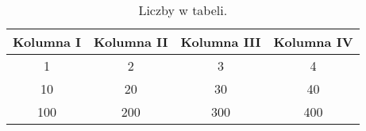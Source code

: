 \begin{table}[htbp]
\centering
\begin{tabular}{|c|c|c|c|}
     \hline 
     Kolumna I & Kolumna II & Kolumna III & Kolumna IV \\ 
     \hline\hline
     1 & 2 & 3 & 4 \\ \hline
     10 & 20 & 30 & 40 \\ \hline
     100 & 200 & 300 & 400 \\ \hline
\end{tabular}
\label{tab:liczby}
\caption{Liczby w tabeli.}
\end{table}